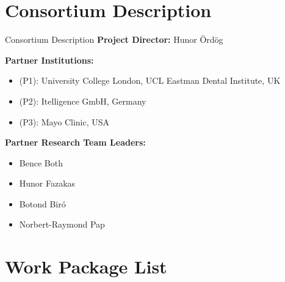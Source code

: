 \documentclass{beamer}
\begin{document}
\section[Consortium Description]{Consortium Description}

\begin{frame}{Consortium Description}
  \textbf{Project Director:} Hunor Ördög

  \textbf{Partner Institutions:}
  \begin{itemize}
    \item (P1): University College London, UCL Eastman Dental Institute, UK
    \item (P2): Itelligence GmbH, Germany
    \item (P3): Mayo Clinic, USA
  \end{itemize}

  \textbf{Partner Research Team Leaders:}
  \begin{itemize}
    \item Bence Both
    \item Hunor Fazakas
    \item Botond Biró
    \item Norbert-Raymond Pap
  \end{itemize}
\end{frame}

\section[Work Package List]{Work Package List}
\end{document}
